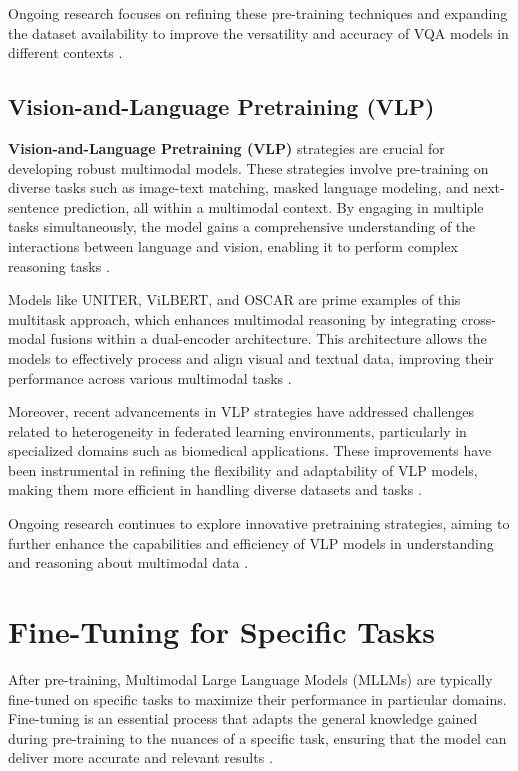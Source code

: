 Ongoing research focuses on refining these pre-training techniques and expanding the dataset availability to improve the versatility and accuracy of VQA models in different contexts \cite{pengfeiliHEU2023}.


\subsection{Vision-and-Language Pretraining (VLP)}

\textbf{Vision-and-Language Pretraining (VLP)} strategies are crucial for developing robust multimodal models. These strategies involve pre-training on diverse tasks such as image-text matching, masked language modeling, and next-sentence prediction, all within a multimodal context. By engaging in multiple tasks simultaneously, the model gains a comprehensive understanding of the interactions between language and vision, enabling it to perform complex reasoning tasks \cite{VisoAI2024}.

Models like UNITER, ViLBERT, and OSCAR are prime examples of this multitask approach, which enhances multimodal reasoning by integrating cross-modal fusions within a dual-encoder architecture. This architecture allows the models to effectively process and align visual and textual data, improving their performance across various multimodal tasks \cite{FlexibleVLP2023}.

Moreover, recent advancements in VLP strategies have addressed challenges related to heterogeneity in federated learning environments, particularly in specialized domains such as biomedical applications. These improvements have been instrumental in refining the flexibility and adaptability of VLP models, making them more efficient in handling diverse datasets and tasks \cite{HeterogeneityFederatedVLP2024}.

Ongoing research continues to explore innovative pretraining strategies, aiming to further enhance the capabilities and efficiency of VLP models in understanding and reasoning about multimodal data \cite{FeedbackModalSearch2024}.



\section{Fine-Tuning for Specific Tasks}

After pre-training, Multimodal Large Language Models (MLLMs) are typically fine-tuned on specific tasks to maximize their performance in particular domains. Fine-tuning is an essential process that adapts the general knowledge gained during pre-training to the nuances of a specific task, ensuring that the model can deliver more accurate and relevant results \cite{TenyksBlogger2024}.

